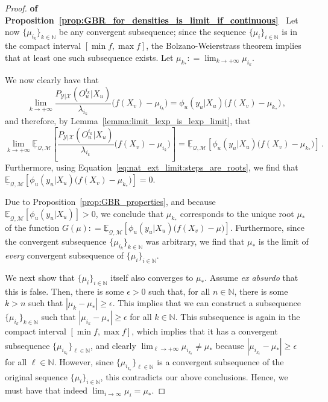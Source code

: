 \documentclass[twoside,11pt]{article}
\newcommand{\nats}{\mathbb{N}}
\newcommand{\states}{\mathcal{X}}
\newcommand{\observs}{\mathcal{Y}}
\newcommand{\lexp}{\underline{\mathbb{E}}_{\rateset,\mathcal{M}}}
\newcommand{\rateset}{\mathcal{Q}}
\newcommand{\abs}[1]{\left\vert #1 \right\vert}
\newcommand{\coloneqq}{:\!=}
\begin{document}
\begin{proof}{\bf of Proposition~\ref{prop:GBR_for_densities_is_limit_if_continuous}~}
Let now $\{\mu_{i_k}\}_{k\in\nats}$ be any convergent subsequence; since the sequence $\{\mu_i\}_{i\in\nats}$ is in the compact interval $[\min f,\max f]$, the Bolzano-Weierstrass theorem implies that at least one such subsequence exists. Let $\mu_{k_*}\coloneqq \lim_{k\to+\infty}\mu_{i_k}$.

We now clearly have that
\begin{equation*}
\lim_{k\to+\infty} \frac{P_{\observs\vert\states}(O_u^{i_k}\vert X_u)}{\lambda_{i_k}}\bigl(f(X_v) - \mu_{i_k}\bigr) = \phi_u(y_u\vert X_u)\bigl(f(X_v) - \mu_{k_*}\bigr)\,,
\end{equation*}
and therefore, by Lemma~\ref{lemma:limit_lexp_is_lexp_limit}, that
\begin{equation*}
\lim_{k\to+\infty} \lexp\left[\frac{P_{\observs\vert\states}(O_u^{i_k}\vert X_u)}{\lambda_{i_k}}\bigl(f(X_v) - \mu_{i_k}\bigr)\right] = \lexp\left[\phi_u(y_u\vert X_u)\bigl(f(X_v) - \mu_{k_*}\bigr)\right]\,.
\end{equation*}
Furthermore, using Equation~\eqref{eq:nat_ext_limit:steps_are_roots}, we find that $\lexp\left[\phi_u(y_u\vert X_u)\bigl(f(X_v) - \mu_{k_*}\bigr)\right] = 0$.

Due to Proposition~\ref{prop:GBR_properties}, and because $\lexp[\phi_u(y_u\vert X_u)]>0$, we conclude that $\mu_{k_*}$ corresponds to the unique root $\mu_*$ of the function $G(\mu)\coloneqq \lexp\left[\phi_u(y_u\vert X_u)\bigl(f(X_v) - \mu\bigr)\right]$. Furthermore, since the convergent subsequence $\{\mu_{i_k}\}_{k\in\nats}$ was arbitrary, we find that $\mu_*$ is the limit of \emph{every} convergent subsequence of $\{\mu_i\}_{i\in\nats}$.

We next show that $\{\mu_i\}_{i\in\nats}$ itself also converges to $\mu_*$. Assume \emph{ex absurdo} that this is false. Then, there is some $\epsilon>0$ such that, for all $n\in\nats$, there is some $k>n$ such that $\abs{\mu_k - \mu_*} \geq \epsilon$. This implies that we can construct a subsequence $\{\mu_{i_k}\}_{k\in\nats}$ such that $\abs{\mu_{i_k}-\mu_*}\geq \epsilon$ for all $k\in\nats$. This subsequence is again in the compact interval $[\min f, \max f]$, which implies that it has a convergent subsequence $\{\mu_{i_{k_\ell}}\}_{\ell\in\nats}$, and clearly $\lim_{\ell\to+\infty}\mu_{i_{k_\ell}} \neq \mu_*$ because $\abs{\mu_{i_{k_\ell}} - \mu_*}\geq\epsilon$ for all $\ell\in\nats$. However, since $\{\mu_{i_{k_\ell}}\}_{\ell\in\nats}$ is a convergent subsequence of the original sequence $\{\mu_i\}_{i\in\nats}$, this contradicts our above conclusions. Hence, we must have that indeed $\lim_{i\to\infty}\mu_i=\mu_*$.


\end{proof}
\end{document}
